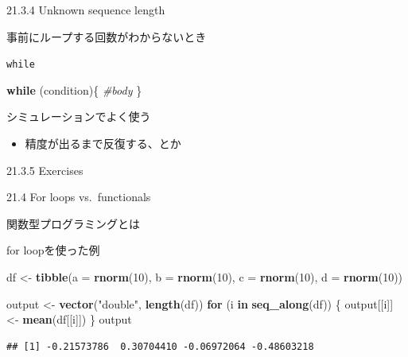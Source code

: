 \documentclass[ignorenonframetext,]{beamer}
\newenvironment{Shaded}{\begin{snugshade}}{\end{snugshade}}
\newcommand{\KeywordTok}[1]{\textcolor[rgb]{0.13,0.29,0.53}{\textbf{#1}}}
\newcommand{\DataTypeTok}[1]{\textcolor[rgb]{0.13,0.29,0.53}{#1}}
\newcommand{\DecValTok}[1]{\textcolor[rgb]{0.00,0.00,0.81}{#1}}
\newcommand{\StringTok}[1]{\textcolor[rgb]{0.31,0.60,0.02}{#1}}
\newcommand{\CommentTok}[1]{\textcolor[rgb]{0.56,0.35,0.01}{\textit{#1}}}
\newcommand{\ControlFlowTok}[1]{\textcolor[rgb]{0.13,0.29,0.53}{\textbf{#1}}}
\newcommand{\NormalTok}[1]{#1}
\providecommand{\tightlist}{%
  \setlength{\itemsep}{0pt}\setlength{\parskip}{0pt}}
\begin{document}
\begin{frame}{21.3.4 Unknown sequence length}

事前にループする回数がわからないとき

\end{frame}

\begin{frame}[fragile]{\texttt{while}}

\begin{Shaded}
\begin{Highlighting}[]
\ControlFlowTok{while}\NormalTok{ (condition)\{}
  \CommentTok{#body}
\NormalTok{\}}
\end{Highlighting}
\end{Shaded}

シミュレーションでよく使う

\begin{itemize}
\tightlist
\item
  精度が出るまで反復する、とか
\end{itemize}

\end{frame}

\begin{frame}{21.3.5 Exercises}

\end{frame}

\begin{frame}{21.4 For loops vs.~functionals}

関数型プログラミングとは

\end{frame}

\begin{frame}[fragile]{for loopを使った例}

\begin{Shaded}
\begin{Highlighting}[]
\NormalTok{df <-}\StringTok{ }\KeywordTok{tibble}\NormalTok{(}\DataTypeTok{a =} \KeywordTok{rnorm}\NormalTok{(}\DecValTok{10}\NormalTok{),}
         \DataTypeTok{b =} \KeywordTok{rnorm}\NormalTok{(}\DecValTok{10}\NormalTok{),}
         \DataTypeTok{c =} \KeywordTok{rnorm}\NormalTok{(}\DecValTok{10}\NormalTok{),}
         \DataTypeTok{d =} \KeywordTok{rnorm}\NormalTok{(}\DecValTok{10}\NormalTok{))}

\NormalTok{output <-}\StringTok{ }\KeywordTok{vector}\NormalTok{(}\StringTok{"double"}\NormalTok{, }\KeywordTok{length}\NormalTok{(df))}
\ControlFlowTok{for}\NormalTok{ (i }\ControlFlowTok{in} \KeywordTok{seq_along}\NormalTok{(df)) \{}
\NormalTok{    output[[i]] <-}\StringTok{ }\KeywordTok{mean}\NormalTok{(df[[i]])}
\NormalTok{\}}
\NormalTok{output}
\end{Highlighting}
\end{Shaded}

\begin{verbatim}
## [1] -0.21573786  0.30704410 -0.06972064 -0.48603218
\end{verbatim}

\end{frame}
\end{document}
